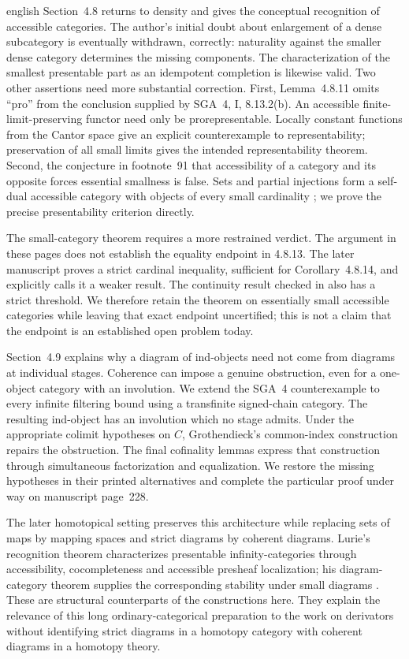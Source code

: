 \begin{otherlanguage*}{english}
Section~4.8 returns to density and gives the conceptual recognition of accessible categories. The author's initial doubt about enlargement of a dense subcategory is eventually withdrawn, correctly: naturality against the smaller dense category determines the missing components. The characterization of the smallest presentable part as an idempotent completion is likewise valid. Two other assertions need more substantial correction. First, Lemma~4.8.11 omits ``pro'' from the conclusion supplied by SGA~4, I, 8.13.2(b). An accessible finite-limit-preserving functor need only be prorepresentable. Locally constant functions from the Cantor space give an explicit counterexample to representability; preservation of all small limits gives the intended representability theorem. Second, the conjecture in footnote~91 that accessibility of a category and its opposite forces essential smallness is false. Sets and partial injections form a self-dual accessible category with objects of every small cardinality \citep[\S3.2]{Heunen2013L2}; we prove the precise presentability criterion directly.

The small-category theorem requires a more restrained verdict. The argument in these pages does not establish the equality endpoint in 4.8.13. The later manuscript proves a strict cardinal inequality, sufficient for Corollary~4.8.14, and explicitly calls it a weaker result. The continuity result checked in \citet{Tendas2022Continuity} also has a strict threshold. We therefore retain the theorem on essentially small accessible categories while leaving that exact endpoint uncertified; this is not a claim that the endpoint is an established open problem today.

Section~4.9 explains why a diagram of ind-objects need not come from diagrams at individual stages. Coherence can impose a genuine obstruction, even for a one-object category with an involution. We extend the SGA~4 counterexample to every infinite filtering bound using a transfinite signed-chain category. The resulting ind-object has an involution which no stage admits. Under the appropriate colimit hypotheses on $C$, Grothendieck's common-index construction repairs the obstruction. The final cofinality lemmas express that construction through simultaneous factorization and equalization. We restore the missing hypotheses in their printed alternatives and complete the particular proof under way on manuscript page~228.

The later homotopical setting preserves this architecture while replacing sets of maps by mapping spaces and strict diagrams by coherent diagrams. Lurie's recognition theorem characterizes presentable infinity-categories through accessibility, cocompleteness and accessible presheaf localization; his diagram-category theorem supplies the corresponding stability under small diagrams \citep[Theorem~5.5.1.1 and Proposition~5.4.4.3]{Lurie2009HTT}. These are structural counterparts of the constructions here. They explain the relevance of this long ordinary-categorical preparation to the work on derivators without identifying strict diagrams in a homotopy category with coherent diagrams in a homotopy theory.
\end{otherlanguage*}
